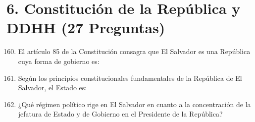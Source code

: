 \documentclass[10pt,a4paper]{article}
\begin{document}
\section{6. Constitución de la República y DDHH (27 Preguntas)}

\begin{enumerate}[label=\textbf{\arabic*.}]
\setcounter{enumi}{159}
\item El artículo 85 de la Constitución consagra que El Salvador es una República cuya forma de gobierno es:
\begin{enumerate}[label=\textbf{\Alph*)}]
\end{enumerate}
\vspace{0.15cm}
\item Según los principios constitucionales fundamentales de la República de El Salvador, el Estado es:
\begin{enumerate}[label=\textbf{\Alph*)}]
\end{enumerate}
\vspace{0.15cm}
\item ¿Qué régimen político rige en El Salvador en cuanto a la concentración de la jefatura de Estado y de Gobierno en el Presidente de la República?
\begin{enumerate}[label=\textbf{\Alph*)}]
\end{enumerate}

\end{enumerate}
\end{document}
